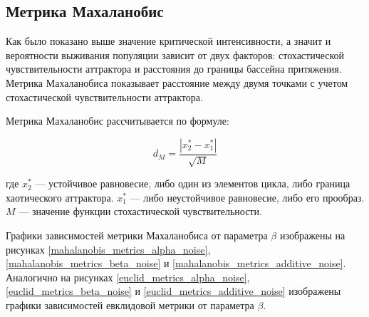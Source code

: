 \subsection{Метрика Махаланобис}

    Как было показано выше значение критической интенсивности, а значит и вероятности выживания популяции зависит от двух факторов: стохастической чувствительности аттрактора и расстояния до границы бассейна притяжения. Метрика Махаланобиса показывает расстояние между двумя точками с учетом стохастической чувствительности аттрактора.

    Метрика Махаланобис рассчитывается по формуле:

    \[
        d_M = \frac{|x_2^* - x_1^*|}{\sqrt{M}}
    \]
        
    где \(x_2^*\) --- устойчивое равновесие, либо один из элементов цикла, либо граница хаотического аттрактора. \(x_1^*\) --- либо неустойчивое равновесие, либо его прообраз. \(M\) --- значение функции стохастической чувствительности.

    Графики зависимостей метрики Махаланобиса от параметра \(\beta\) изображены на рисунках \ref{mahalanobis_metrics_alpha_noise}, \ref{mahalanobis_metrics_beta_noise} и \ref{mahalanobis_metrics_additive_noise}. Аналогично на рисунках \ref{euclid_metrics_alpha_noise}, \ref{euclid_metrics_beta_noise} и \ref{euclid_metrics_additive_noise} изображены графики зависимостей евклидовой метрики от параметра \(\beta\).


